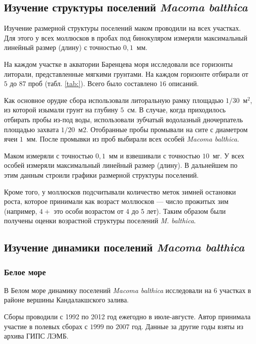 	
	\subsection{Изучение структуры поселений {\it Macoma balthica}}
Изучение размерной структуры поселений маком проводили на всех участках.
Для этого у всех моллюсков в пробах под бинокуляром измеряли максимальный линейный размер (длину) с точностью $0,1$~мм.

  На каждом участке в акватории Баренцева моря исследовали все  горизонты литорали, представленные мягкими грунтами.  
На каждом горизонте отбирали от $5$ до $87$ проб  (табл.  \ref{tab:}). Всего было составлено $16$ описаний.

Как основное орудие сбора использовали литоральную рамку площадью $1/30$~м$^2$, из которой изымали грунт на глубину $5$~см. 
В случае, когда приходилось отбирать пробы из-под воды, использовали зубчатый водолазный дночерпатель площадью захвата $1/20$~м2.
Отобранные пробы промывали на сите с диаметром ячеи $1$~мм. 
После промывки из   проб   выбирали   всех   особей  {\it Macoma balthica}.

   Маком   измеряли  с точностью $0,1$~мм  и взвешивали с точностью $10$~мг.
 У всех особей измеряли максимальный линейный размер (длину). 
В дальнейшем по этим данным строили графики размерной структуры поселений. 

Кроме того, у моллюсков подсчитывали количество меток зимней остановки роста, которое принимали как возраст моллюсков --- число прожитых зим (например, $4+$ это  особи возрастом от $4$ до $5$ лет).   
Таким   образом   были   получены   оценки возрастной структуры поселений {\it M. balthica}.

	\subsection{Изучение динамики поселений {\it Macoma balthica}}
        \subsubsection{Белое море}
В Белом море динамику поселений {\it Macoma balthica} исследовали на $6$ участках в районе вершины Кандалакшского залива. 

Сборы проводили с 1992 по 2012 год ежегодно в июле-августе.
Автор принимала участие в полевых сборах с $1999$ по $2007$ год.
Данные за другие годы взяты из архива ГИПС ЛЭМБ.

